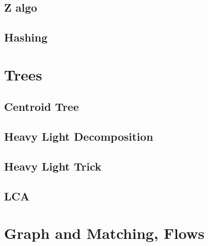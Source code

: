 \documentclass[9pt]{extarticle}
\begin{document}
\begin{multicols*}{3}
\subsection{Z algo} %


\subsection{Hashing} %




\section{Trees}

\subsection{Centroid Tree} %


\subsection{Heavy Light Decomposition} %


\subsection{Heavy Light Trick} %


\subsection{LCA} %


% 

\section{Graph and Matching, Flows}

% 


\end{multicols*}
\end{document}
